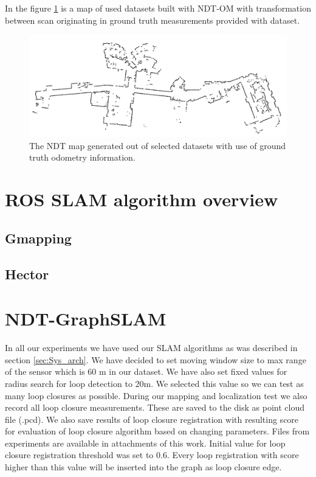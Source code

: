 In the figure \ref{fig:ground_truth} is a map of used datasets built with \gls{NDT-OM} with transformation between scan originating in ground truth measurements provided with dataset. 

\begin{figure}
	\centering
	\includegraphics[width=140mm]{../img/ground_truth.png}
	\caption{The \gls{NDT} map generated out of selected datasets with use of ground truth odometry information.}\label{fig:ground_truth}
\end{figure}
  
\section{ROS SLAM algorithm overview}
\subsection{Gmapping}

\subsection{Hector}

\section{NDT-GraphSLAM}
In all our experiments we have used our \gls{SLAM} algorithms as was described in section \ref{sec:Sys_arch}. We have decided to set moving window size to max range of the sensor which is 60 m in our dataset. We have also set fixed values for radius search for loop detection to 20m. We selected this value so we can test as many loop closures as possible. During our mapping and localization test we also record all loop closure measurements. These are saved to the disk as point cloud file (.pcd). We also save results of loop closure registration with resulting score for evaluation of loop closure algorithm based on changing parameters. Files from experiments are available in attachments of this work. Initial value for loop closure registration threshold was set to 0.6. Every loop registration with score higher than this value will be inserted into the graph as loop closure edge.

